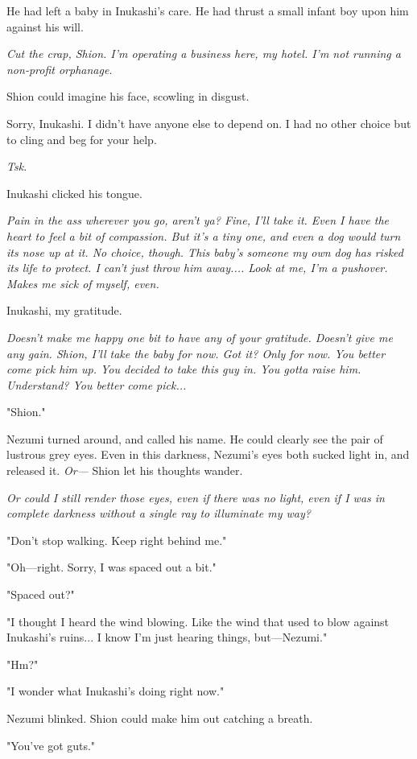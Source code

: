 He had left a baby in Inukashi's care. He had thrust a small infant boy
upon him against his will.

\emph{Cut the crap, Shion. I'm operating a business here, my hotel. I'm not
running a non-profit orphanage.}

Shion could imagine his face, scowling in disgust.

Sorry, Inukashi. I didn't have anyone else to depend on. I had no other
choice but to cling and beg for your help.

\emph{Tsk.}

Inukashi clicked his tongue.

\emph{Pain in the ass wherever you go, aren't ya? Fine, I'll take it. Even I
have the heart to feel a bit of compassion. But it's a tiny one, and
even a dog would turn its nose up at it. No choice, though. This baby's
someone my own dog has risked its life to protect. I can't just throw
him away.... Look at me, I'm a pushover. Makes me sick of myself, even.}

Inukashi, my gratitude.

\emph{Doesn't make me happy one bit to have any of your gratitude. Doesn't
give me any gain. Shion, I'll take the baby \emph{for now}. Got it? Only for
now. You better come pick him up. You decided to take this guy in. You
gotta raise him. Understand? You better come pick...}

"Shion."

Nezumi turned around, and called his name. He could clearly see the pair
of lustrous grey eyes. Even in this darkness, Nezumi's eyes both sucked
light in, and released it. \emph{Or---} Shion let his thoughts wander.

\emph{Or could I still render those eyes, even if there was no light, even if
I was in complete darkness without a single ray to illuminate my way?}

"Don't stop walking. Keep right behind me."

"Oh---right. Sorry, I was spaced out a bit."

"Spaced out?"

"I thought I heard the wind blowing. Like the wind that used to blow
against Inukashi's ruins... I know I'm just hearing things, but---Nezumi."

"Hm?"

"I wonder what Inukashi's doing right now."

Nezumi blinked. Shion could make him out catching a breath.

"You've got guts."

